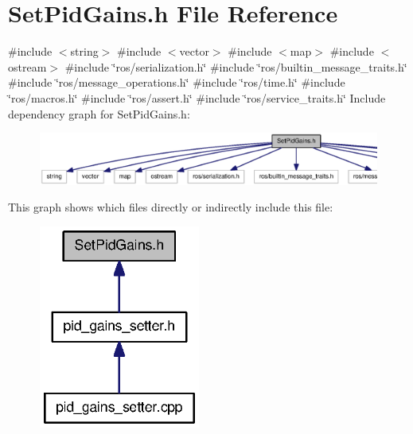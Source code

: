 \section{\-Set\-Pid\-Gains.\-h \-File \-Reference}
\label{SetPidGains_8h}
{\ttfamily \#include $<$string$>$}\*
{\ttfamily \#include $<$vector$>$}\*
{\ttfamily \#include $<$map$>$}\*
{\ttfamily \#include $<$ostream$>$}\*
{\ttfamily \#include \char`\"{}ros/serialization.\-h\char`\"{}}\*
{\ttfamily \#include \char`\"{}ros/builtin\-\_\-message\-\_\-traits.\-h\char`\"{}}\*
{\ttfamily \#include \char`\"{}ros/message\-\_\-operations.\-h\char`\"{}}\*
{\ttfamily \#include \char`\"{}ros/time.\-h\char`\"{}}\*
{\ttfamily \#include \char`\"{}ros/macros.\-h\char`\"{}}\*
{\ttfamily \#include \char`\"{}ros/assert.\-h\char`\"{}}\*
{\ttfamily \#include \char`\"{}ros/service\-\_\-traits.\-h\char`\"{}}\*
\-Include dependency graph for \-Set\-Pid\-Gains.\-h\-:
\nopagebreak
\begin{figure}[H]
\begin{center}
\leavevmode
\includegraphics[width=350pt]{SetPidGains_8h__incl}
\end{center}
\end{figure}
\-This graph shows which files directly or indirectly include this file\-:
\nopagebreak
\begin{figure}[H]
\begin{center}
\leavevmode
\includegraphics[width=150pt]{SetPidGains_8h__dep__incl}
\end{center}
\end{figure}

